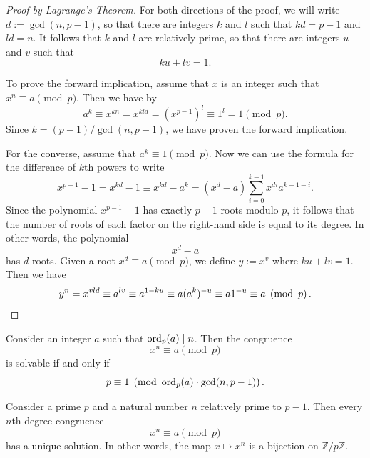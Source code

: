 \begin{proof}[Proof by Lagrange's Theorem]
  For both directions of the proof, we will write $d:=\gcd(n,p-1)$, so that there are integers $k$ and $l$ such that $kd=p-1$ and $ld=n$. It follows that $k$ and $l$ are relatively prime, so that there are integers $u$ and $v$ such that
  \begin{equation*}
    ku+lv=1.
  \end{equation*}
  
  To prove the forward implication, assume that $x$ is an integer such that $x^n\equiv a\pmod{p}$. Then we have by 
  \begin{equation*}
    a^k\equiv x^{kn}=x^{kld}=(x^{p-1})^l\equiv 1^l = 1\pmod{p}.
  \end{equation*}
  Since $k=(p-1)/\gcd(n,p-1)$, we have proven the forward implication.

  For the converse, assume that $a^k\equiv 1\pmod{p}$. Now we can use the formula for the difference of $k$th powers to write
  \begin{equation*}
    x^{p-1}-1=x^{kd}-1\equiv x^{kd}-a^k= (x^{d}-a)\sum_{i=0}^{k-1} x^{di}a^{k-1-i}.
  \end{equation*}
  Since the polynomial $x^{p-1}-1$ has exactly $p-1$ roots modulo $p$, it follows that the number of roots of each factor on the right-hand side is equal to its degree. In other words, the polynomial
  \begin{equation*}
    x^{d}-a
  \end{equation*}
  has $d$ roots. Given a root $x^d\equiv a\pmod{p}$, we define $y:=x^v$ where $ku+lv=1$. Then we have
  \begin{equation*}
    y^n=x^{vld}\equiv a^{lv} \equiv a^{1-ku} \equiv a(a^k)^{-u}\equiv a1^{-u}\equiv a\pmod{p}.\qedhere
  \end{equation*}
\end{proof}

\begin{corollary}
  Consider an integer $a$ such that $\ord_p(a)\mid n$. Then the congruence
  \begin{equation*}
    x^n\equiv a\pmod{p}
  \end{equation*}
  is solvable if and only if
  \begin{equation*}
    p\equiv 1\pmod{\ord_p(a)\cdot \gcd(n,p-1)}.
  \end{equation*}
\end{corollary}

\begin{corollary}
  Consider a prime $p$ and a natural number $n$ relatively prime to $p-1$. Then every $n$th degree congruence
  \begin{equation*}
    x^n\equiv a\pmod{p}
  \end{equation*}
  has a unique solution. In other words, the map $x\mapsto x^n$ is a bijection on $\mathbb{Z}/p\mathbb{Z}$.
\end{corollary}

